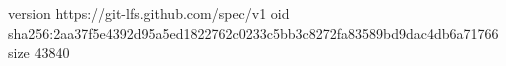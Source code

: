 version https://git-lfs.github.com/spec/v1
oid sha256:2aa37f5e4392d95a5ed1822762c0233c5bb3c8272fa83589bd9dac4db6a71766
size 43840
